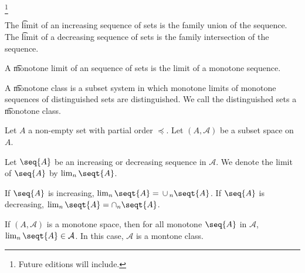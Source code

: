 
  \ifhmode\unskip\fi\footnote{
Future editions will include.
  }



The
\t{limit}
of an increasing sequence
of sets is the family
union of the sequence.
The
\t{limit}
of a decreasing sequence
of sets is the family
intersection of the sequence.

A
\t{monotone limit}
of an sequence of sets
is the limit of a
monotone sequence.

A
\t{monotone class}
is a
subset system in which
monotone limits of
monotone sequences
of distinguished sets are distinguished.
We call the distinguished sets a
\t{monotone class}.


Let $A$ a non-empty set with
partial order $\preceq$.
Let $(A, \mathcal{A})$ be a
subset space on $A$.

Let $\seq{A}$ be an increasing
or decreasing sequence in $\mathcal{A}$.
We denote the limit of $\seq{A}$
by $\lim_{n} \seqt{A}$.

If $\seq{A}$ is increasing,
$\lim_n \seqt{A} = \union_{n} \seqt{A}$.
If $\seq{A}$ is decreasing,
$\lim_n \seqt{A} = \intersection_{n} \seqt{A}$.

If $(A, \mathcal{A})$ is a monotone space,
then for all monotone
$\seq{A}$ in $\mathcal{A}$,
$\lim_{n} \seqt{A} \in \mathcal{A}$.
In this case, $\mathcal{A}$ is a montone class.

\blankpage
